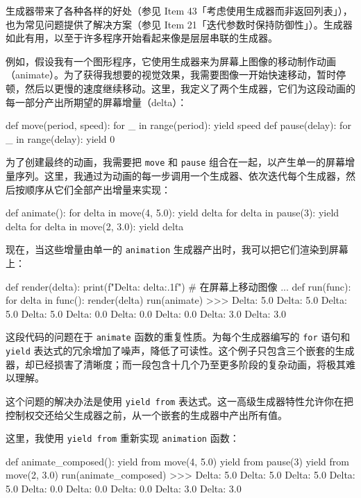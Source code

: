 生成器带来了各种各样的好处（参见 Item 43「考虑使用生成器而非返回列表」），也为常见问题提供了解决方案（参见 Item 21「迭代参数时保持防御性」）。生成器如此有用，以至于许多程序开始看起来像是层层串联的生成器。

例如，假设我有一个图形程序，它使用生成器来为屏幕上图像的移动制作动画（animate）。为了获得我想要的视觉效果，我需要图像一开始快速移动，暂时停顿，然后以更慢的速度继续移动。这里，我定义了两个生成器，它们为这段动画的每一部分产出所期望的屏幕增量（delta）：

\begin{codebox}[python]
def move(period, speed):
    for _ in range(period):
        yield speed
def pause(delay):
    for _ in range(delay):
        yield 0
\end{codebox}

为了创建最终的动画，我需要把 \texttt{move} 和 \texttt{pause} 组合在一起，以产生单一的屏幕增量序列。这里，我通过为动画的每一步调用一个生成器、依次迭代每个生成器，然后按顺序从它们全部产出增量来实现：

\begin{codebox}[python]
def animate():
    for delta in move(4, 5.0):
        yield delta
    for delta in pause(3):
        yield delta
    for delta in move(2, 3.0):
        yield delta
\end{codebox}

现在，当这些增量由单一的 \texttt{animation} 生成器产出时，我可以把它们渲染到屏幕上：

\begin{codebox}[python]
def render(delta):
    print(f"Delta: {delta:.1f}")
    # 在屏幕上移动图像
    ...
def run(func):
    for delta in func():
        render(delta)
run(animate)
>>>
Delta: 5.0
Delta: 5.0
Delta: 5.0
Delta: 5.0
Delta: 0.0
Delta: 0.0
Delta: 0.0
Delta: 3.0
Delta: 3.0
\end{codebox}

这段代码的问题在于 \texttt{animate} 函数的重复性质。为每个生成器编写的 \texttt{for} 语句和 \texttt{yield} 表达式的冗余增加了噪声，降低了可读性。这个例子只包含三个嵌套的生成器，却已经损害了清晰度；而一段包含十几个乃至更多阶段的复杂动画，将极其难以理解。

这个问题的解决办法是使用 \texttt{yield from} 表达式。这一高级生成器特性允许你在把控制权交还给父生成器之前，从一个嵌套的生成器中产出所有值。

这里，我使用 \texttt{yield from} 重新实现 \texttt{animation} 函数：

\begin{codebox}[python]
def animate_composed():
    yield from move(4, 5.0)
    yield from pause(3)
    yield from move(2, 3.0)
run(animate_composed)
>>>
Delta: 5.0
Delta: 5.0
Delta: 5.0
Delta: 5.0
Delta: 0.0
Delta: 0.0
Delta: 0.0
Delta: 3.0
Delta: 3.0
\end{codebox}

